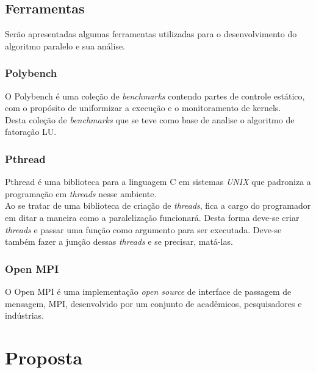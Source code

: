 \documentclass[12pt]{article}
\newcommand\tab[1][1cm]{\hspace*{#1}}
\begin{document}
\subsection{Ferramentas}\label{subsec:cargabalanc}
\tab Serão apresentadas algumas ferramentas utilizadas para  o desenvolvimento do  algoritmo paralelo e sua análise.
\subsubsection{Polybench}
\tab O Polybench é uma coleção de \textit{benchmarks} contendo partes de controle estático, com o propósito de uniformizar a execução e o monitoramento de kernels. 
\\
\tab Desta coleção de \textit{benchmarks} que se teve como base de analise o algoritmo de fatoração LU.  
 
\subsubsection{Pthread}\label{subsubsec:pthread}
\tab Pthread é uma biblioteca para a linguagem C em sistemas \textit{UNIX} que padroniza a programação em \textit{threads} nesse ambiente.
\\
\tab Ao se tratar de uma biblioteca de criação de \textit{threads}, fica a cargo do programador em ditar a maneira como a paralelização funcionará. Desta forma deve-se criar \textit{threads} e passar uma função como argumento para ser executada. Deve-se também fazer a junção dessas \textit{threads}  e se precisar, matá-las.

\subsubsection{Open MPI}\label{subsubsec:ompi}
\tab O Open MPI é uma implementação \textit{open source} de interface de passagem de mensagem, MPI, desenvolvido por um conjunto de acadêmicos, pesquisadores e indústrias.

\section{Proposta}\label{sec:prop}
\end{document}
